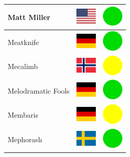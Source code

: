 \documentclass[12pt, a4paper, twoside]{report}
\begin{document}
\begin{center}
\begin{longtable}{|p{5cm}|p{2cm}|p{2cm}|}
Matt Miller & \includegraphics[width=1cm]{4x3/us} & \includegraphics[width=1cm]{likes/y} \\ \hline
Meatknife & \includegraphics[width=1cm]{4x3/de} & \includegraphics[width=1cm]{likes/y} \\ \hline
Mecalimb & \includegraphics[width=1cm]{4x3/no} & \includegraphics[width=1cm]{likes/m} \\ \hline
Melodramatic Fools & \includegraphics[width=1cm]{4x3/de} & \includegraphics[width=1cm]{likes/y} \\ \hline
Membaris & \includegraphics[width=1cm]{4x3/de} & \includegraphics[width=1cm]{likes/m} \\ \hline
Mephorash & \includegraphics[width=1cm]{4x3/se} & \includegraphics[width=1cm]{likes/y} \\ \hline

\end{longtable}
\end{center}
\end{document}
